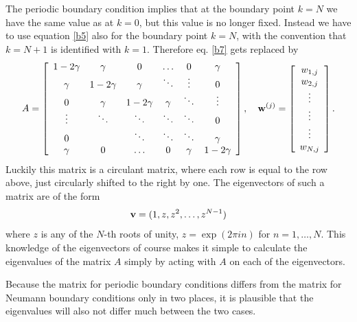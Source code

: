 {{The periodic boundary condition implies that at the boundary point
$k=N$ we have the same value as at $k=0$, but this value is no longer fixed.
Instead we have to use equation \eqref{b5} also for the boundary point $k=N$, 
with the convention that $k=N+1$ is identified with $k=1$. Therefore
eq. \eqref{b7} gets replaced by
\begin{equation}
A=\left[
\begin{array}{cccccc}
1-2\gamma &\gamma &0      &\dots  &0 &\gamma \\
\gamma &1-2\gamma &\gamma &\ddots  &\vdots &0\\
0      &\gamma &1-2\gamma &\gamma &\ddots &\vdots \\
\vdots &\ddots &\ddots &\ddots &\ddots &0 \\
0 &       &\ddots &\ddots &\ddots &\gamma \\
\gamma      &0  &\dots  &0      &\gamma &1-2\gamma
\end{array}\right], \quad
{\bf w}^{(j)}=\left[
\begin{array}{c}
w_{1,j} \\
w_{2,j} \\
\vdots \\
\vdots \\
\vdots \\
w_{N,j}
\end{array}\right].
\label{bp7}
\end{equation}
Luckily this matrix is a
circulant matrix, where each row is equal to the row above, just circularly
shifted to the right by one. 
The eigenvectors of such a matrix are of the form
\[{\bf v} = (1,z,z^2,\dots,z^{N-1})\]
where $z$ is any of the $N$-th roots of unity, $z=\exp(2\pi i n)$ for $n=1,\dots,N$. This knowledge of the
eigenvectors of course makes it simple to calculate the eigenvalues
of the matrix $A$ simply by acting with $A$ on each of the eigenvectors.

Because the matrix for periodic boundary conditions differs from the matrix
for Neumann boundary conditions only in two places, it is plausible that
the eigenvalues will also not differ much between the two cases.

}}
